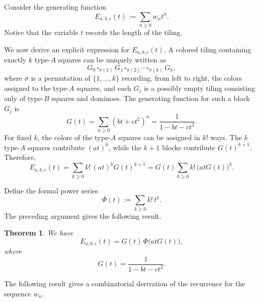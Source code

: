 \documentclass[11pt]{amsart}
\theoremstyle{plain}
\numberwithin{equation}{section}
\newtheorem{theorem}[thm]{Theorem}
\begin{document}
Consider the  generating function
\[
E_{a,b,c}(t):=\sum_{n\ge 0} w_nt^n.
\]
Notice that the variable $t$ records the length of the tiling.

We now derive an explicit expression for $E_{a,b,c}(t)$. A colored tiling containing exactly $k$ type-$A$ squares can be uniquely written as
\[
G_0\,\square_{\sigma(1)}\,G_1\,\square_{\sigma(2)}\cdots \square_{\sigma(k)}\,G_k,
\]
where $\sigma$ is a permutation of $\{1,\dots,k\}$ recording,  from left to right, the colors assigned to the type-$A$ squares, and each $G_j$ is a possibly empty tiling consisting  only of type-$B$ squares and dominoes. The generating function for such a block $G_j$ is
\[
G(t)=\sum_{n\geq 0}(bt+ct^2)^n=\frac{1}{1-bt-ct^2}.
\]
For fixed $k$, the colors of the type-$A$ squares can be assigned in $k!$ ways. The $k$ type-$A$ squares contribute $(at)^k$, while the $k+1$ blocks contribute $G(t)^{k+1}$. Therefore,
\[
E_{a,b,c}(t)
=
\sum_{k\geq 0} k!\,(at)^k G(t)^{k+1}
=
G(t)\sum_{k\geq 0} k!\,\bigl(atG(t)\bigr)^k.
\]

Define the formal power series
\[
\Phi(t):=\sum_{k\geq 0}k!\,t^k.
\]
The preceding argument gives the following result.

\begin{theorem}\label{thm:Eabc}
We have 
\[
E_{a,b,c}(t)
=
G(t)\,\Phi\bigl(atG(t)\bigr),
\]
where
\[
G(t)=\frac{1}{1-bt-ct^2}.
\]
\end{theorem}

The following result gives a combinatorial derivation of the recurrence for the sequence $w_n$.
\end{document}
